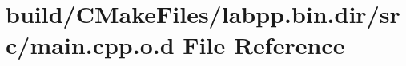 \hypertarget{build_2CMakeFiles_2labpp_8bin_8dir_2src_2main_8cpp_8o_8d}{}\section{build/\+C\+Make\+Files/labpp.bin.\+dir/src/main.cpp.\+o.\+d File Reference}
\label{build_2CMakeFiles_2labpp_8bin_8dir_2src_2main_8cpp_8o_8d}
